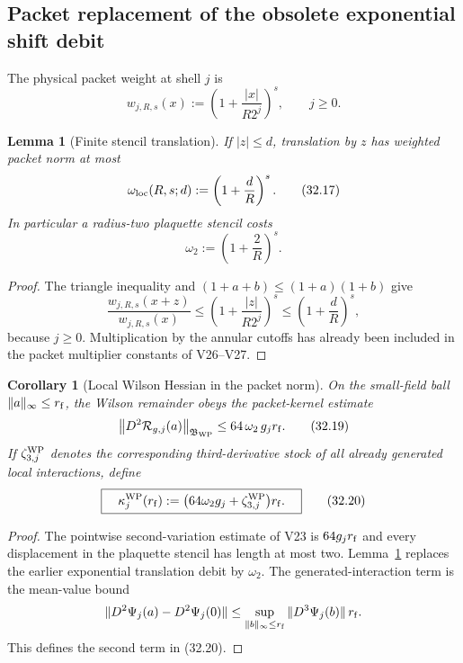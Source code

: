 \documentclass[11pt,oneside]{book}
\newtheorem{lemma}[theorem]{Lemma}
\newtheorem{corollary}[theorem]{Corollary}
\theoremstyle{definition}
\theoremstyle{remark}
\begin{document}
\subsection{Packet replacement of the obsolete exponential shift debit}

The physical packet weight at shell \(j\) is
\[
 w_{j,R,s}(x):=
 \left(1+\frac{|x|}{R2^j}\right)^s,\qquad j\geq0.                 \tag{32.16}
\]

\begin{lemma}[Finite stencil translation]
\label{lem:e8v32-stencil}
If \(|z|\leq d\), translation by \(z\) has weighted packet norm at
most
\[
 \omega_{\rm loc}(R,s;d):=
 \left(1+\frac dR\right)^s.                                     \tag{32.17}
\]
In particular a radius-two plaquette stencil costs
\[
                         \omega_2:=\left(1+\frac2R\right)^s.     \tag{32.18}
\]
\end{lemma}

\begin{proof}
The triangle inequality and
\((1+a+b)\leq(1+a)(1+b)\) give
\[
 \frac{w_{j,R,s}(x+z)}{w_{j,R,s}(x)}
 \leq
 \left(1+\frac{|z|}{R2^j}\right)^s
 \leq\left(1+\frac dR\right)^s,
\]
because \(j\geq0\).  Multiplication by the annular cutoffs has already
been included in the packet multiplier constants of V26--V27.
\end{proof}

\begin{corollary}[Local Wilson Hessian in the packet norm]
\label{cor:e8v32-Wilson-Hessian}
On the small-field ball \(\|a\|_\infty\leq r_{\rm f}\), the Wilson
remainder obeys the packet-kernel estimate
\[
 \left\|D^2{\cal R}_{g,j}(a)\right\|_{\mathfrak B_{\rm WP}}
 \leq64\,\omega_2\,g_j r_{\rm f}.                               \tag{32.19}
\]
If \(\zeta^{\rm WP}_{3,j}\) denotes the corresponding third-derivative
stock of all already generated local interactions, define
\[
 \boxed{\quad
 \kappa_j^{\rm WP}(r_{\rm f})
 :=
 \bigl(64\omega_2g_j+\zeta^{\rm WP}_{3,j}\bigr)r_{\rm f}.
 \quad}                                                          \tag{32.20}
\]
\end{corollary}

\begin{proof}
The pointwise second-variation estimate of V23 is \(64g_jr_{\rm f}\)
and every displacement in the plaquette stencil has length at most
two.  Lemma~\ref{lem:e8v32-stencil} replaces the earlier exponential
translation debit by \(\omega_2\).  The generated-interaction term is
the mean-value bound
\[
 \|D^2\Psi_j(a)-D^2\Psi_j(0)\|
 \leq
 \sup_{\|b\|_\infty\leq r_{\rm f}}\|D^3\Psi_j(b)\|\,r_{\rm f}.
\]
This defines the second term in (32.20).
\end{proof}
\end{document}

